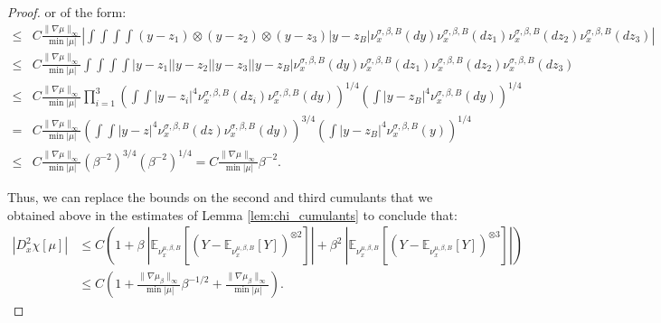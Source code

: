 \documentclass[10pt,a4paper]{amsart}
\begin{document}
\begin{proof}
or of the form:
\begin{align*}
\leq&C\frac{\|\nabla \mu\|_\infty}{\min |\mu|}\left|\int\int\int\int (y-z_1)\otimes(y-z_2)\otimes(y-z_3) |y-z_B| \nu_x^{\sigma, \beta, B}(dy) \nu_x^{\sigma, \beta, B}(dz_1) \nu_x^{\sigma, \beta, B}(dz_2) \nu_x^{\sigma, \beta, B}(dz_3)\right|\\
\leq&C \frac{\|\nabla \mu\|_\infty}{\min |\mu|}\int\int\int\int |y-z_1||y-z_2||y-z_3||y-z_B| \nu_x^{\sigma, \beta, B}(dy)  \nu_x^{\sigma, \beta, B}(dz_1) \nu_x^{\sigma, \beta, B}(dz_2) \nu_x^{\sigma, \beta, B}(dz_3)\\
\leq&C\frac{\|\nabla \mu\|_\infty}{\min |\mu|} \prod_{i=1}^3\left(\int\int|y-z_i|^4\nu_x^{\sigma, \beta, B}(dz_i) \nu_x^{\sigma, \beta, B}(dy) \right)^{1/4} \left(\int |y-z_B|^4 \nu_x^{\sigma, \beta, B}(dy)\right)^{1/4}\\
=&C\frac{\|\nabla \mu\|_\infty}{\min |\mu|}\left(\int \int|y-z|^4\nu_x^{\sigma, \beta, B}(dz) \nu_x^{\sigma, \beta, B}(dy)\right)^{3/4} \left( \int |y-z_B|^4 \nu_x^{\sigma, \beta, B}(y)\right)^{1/4}\\
\leq&C\frac{\|\nabla \mu\|_\infty}{\min |\mu|} (\beta^{-2})^{3/4} (\beta^{-2})^{1/4}=C\frac{\|\nabla \mu\|_\infty}{\min |\mu|} \beta^{-2}.
\end{align*} 

Thus, we can replace the bounds on the second and third cumulants that we obtained above in the estimates of Lemma \ref{lem:chi_cumulants} to conclude that:
\begin{align*}
|D^2_x\chi[\mu]|&\leq C\left(1+ \beta\ | \mathbb{E}_{\nu_{x}^{\mu,\beta,B}}[\left(Y-\mathbb{E}_{\nu_{x}^{\mu,\beta,B}}[Y]\right)^{\otimes 2}]|+\beta^2 \ | \mathbb{E}_{\nu_{x}^{\mu,\beta,B}}[\left(Y-\mathbb{E}_{\nu_{x}^{\mu,\beta,B}}[Y]\right)^{\otimes 3}]|\right)\\
&\leq C\left(1+\frac{\|\nabla \mu_\beta\|_\infty}{\min |\mu|}\beta^{-1/2}+\frac{\|\nabla \mu_\beta\|_\infty}{\min |\mu|}\right).
\end{align*}
\end{proof}
\end{document}
